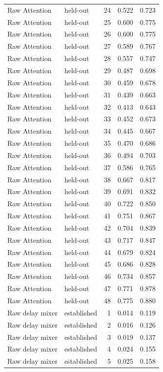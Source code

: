 \begin{tabular}{llrrr}
Raw Attention & held-out & 24 & 0.522 & 0.723 \\
Raw Attention & held-out & 25 & 0.600 & 0.775 \\
Raw Attention & held-out & 26 & 0.600 & 0.775 \\
Raw Attention & held-out & 27 & 0.589 & 0.767 \\
Raw Attention & held-out & 28 & 0.557 & 0.747 \\
Raw Attention & held-out & 29 & 0.487 & 0.698 \\
Raw Attention & held-out & 30 & 0.459 & 0.678 \\
Raw Attention & held-out & 31 & 0.439 & 0.663 \\
Raw Attention & held-out & 32 & 0.413 & 0.643 \\
Raw Attention & held-out & 33 & 0.452 & 0.673 \\
Raw Attention & held-out & 34 & 0.445 & 0.667 \\
Raw Attention & held-out & 35 & 0.470 & 0.686 \\
Raw Attention & held-out & 36 & 0.494 & 0.703 \\
Raw Attention & held-out & 37 & 0.586 & 0.765 \\
Raw Attention & held-out & 38 & 0.667 & 0.817 \\
Raw Attention & held-out & 39 & 0.691 & 0.832 \\
Raw Attention & held-out & 40 & 0.722 & 0.850 \\
Raw Attention & held-out & 41 & 0.751 & 0.867 \\
Raw Attention & held-out & 42 & 0.704 & 0.839 \\
Raw Attention & held-out & 43 & 0.717 & 0.847 \\
Raw Attention & held-out & 44 & 0.679 & 0.824 \\
Raw Attention & held-out & 45 & 0.686 & 0.828 \\
Raw Attention & held-out & 46 & 0.734 & 0.857 \\
Raw Attention & held-out & 47 & 0.771 & 0.878 \\
Raw Attention & held-out & 48 & 0.775 & 0.880 \\
Raw delay mixer & established & 1 & 0.014 & 0.119 \\
Raw delay mixer & established & 2 & 0.016 & 0.126 \\
Raw delay mixer & established & 3 & 0.019 & 0.137 \\
Raw delay mixer & established & 4 & 0.024 & 0.155 \\
Raw delay mixer & established & 5 & 0.025 & 0.158 \\

\end{tabular}
